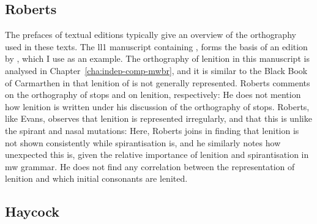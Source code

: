 \subsection{Roberts}
\label{sec:roberts}

The prefaces of textual editions typically give an overview of the orthography used in these texts. The \gls{ll1} manuscript containing , forms the basis of an edition
by \textcite{roberts_brut_1971}, which I use as an example. The orthography of lenition in this manuscript is analysed in Chapter~\ref{cha:indep-comp-mwbr}, and it is similar to the Black Book of Carmarthen in that lenition of  is not generally represented. Roberts comments on the
orthography of stops and on lenition, respectively:
He does not mention how lenition is written under his discussion of the orthography of stops. Roberts, like Evans, observes that lenition is represented irregularly, and that this is unlike the spirant and nasal mutations:
Here, Roberts joins \textcite{evans_grammar_1964} in finding that lenition is not shown consistently while spirantisation is, and he similarly notes how unexpected this is, given the relative importance of lenition and spirantisation in \gls{mw} grammar. He does not find any correlation between the representation of lenition and which initial consonants are lenited.

\subsection{Haycock}
\label{sec:haycock}

